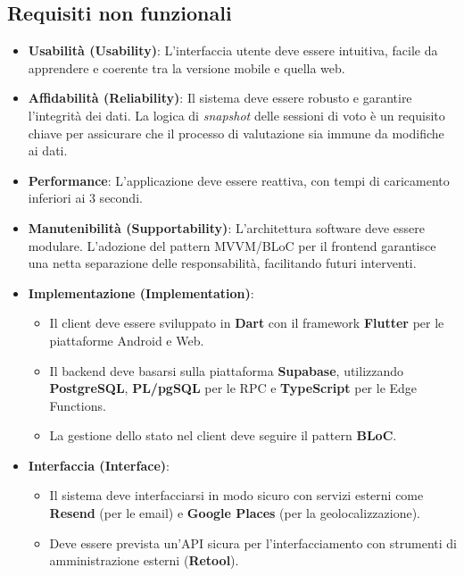 \subsection{Requisiti non funzionali}\label{subsec:requisiti-non-funzionali}
\begin{itemize}
    \item \textbf{Usabilità (Usability)}: L'interfaccia utente deve essere intuitiva, facile da apprendere e coerente tra la versione mobile e quella web.
    \item \textbf{Affidabilità (Reliability)}: Il sistema deve essere robusto e garantire l'integrità dei dati.
    La logica di \emph{snapshot} delle sessioni di voto è un requisito chiave per assicurare che il processo di valutazione sia immune da modifiche ai dati.
    \item \textbf{Performance}: L'applicazione deve essere reattiva, con tempi di caricamento inferiori ai 3 secondi.
    \item \textbf{Manutenibilità (Supportability)}: L'architettura software deve essere modulare.
    L'adozione del pattern MVVM/BLoC per il frontend garantisce una netta separazione delle responsabilità, facilitando futuri interventi.
    \item \textbf{Implementazione (Implementation)}:
    \begin{itemize}
        \item Il client deve essere sviluppato in \textbf{Dart} con il framework \textbf{Flutter} per le piattaforme Android e Web.
        \item Il backend deve basarsi sulla piattaforma \textbf{Supabase}, utilizzando \textbf{PostgreSQL}, \textbf{PL/pgSQL} per le RPC e \textbf{TypeScript} per le Edge Functions.
        \item La gestione dello stato nel client deve seguire il pattern \textbf{BLoC}.
    \end{itemize}
    \item \textbf{Interfaccia (Interface)}:
    \begin{itemize}
        \item Il sistema deve interfacciarsi in modo sicuro con servizi esterni come \textbf{Resend} (per le email) e \textbf{Google Places} (per la geolocalizzazione).
        \item Deve essere prevista un'API sicura per l'interfacciamento con strumenti di amministrazione esterni (\textbf{Retool}).
    \end{itemize}

\end{itemize}
